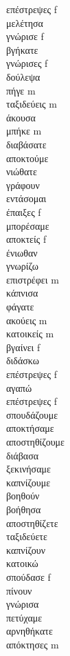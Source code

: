 επέστρεψες f \\ 
μελέτησα  \\ 
γνώρισε f \\ 
βγήκατε  \\ 
γνώρισες f \\ 
δούλεψα  \\ 
πήγε m \\ 
ταξιδεύεις m \\ 
άκουσα  \\ 
μπήκε m \\ 
διαβάσατε  \\ 
αποκτούμε  \\ 
νιώθατε  \\ 
γράφουν  \\ 
εντάσομαι  \\ 
έπαιξες f \\ 
μπορέσαμε  \\ 
αποκτείς f \\ 
ένιωθαν  \\ 
γνωρίζω  \\ 
επιστρέφει m \\ 
κάπνισα  \\ 
φάγατε  \\ 
ακούεις m \\ 
κατοικείς m \\ 
βγαίνει f \\ 
διδάσκω  \\ 
επέστρεψες f \\ 
αγαπώ  \\ 
επέστρεψες f \\ 
σπουδάζουμε  \\ 
αποκτήσαμε  \\ 
αποστηθίζουμε  \\ 
διάβασα  \\ 
ξεκινήσαμε  \\ 
καπνίζουμε  \\ 
βοηθούν  \\ 
βοήθησα  \\ 
αποστηθίζετε  \\ 
ταξιδεύετε  \\ 
καπνίζουν  \\ 
κατοικώ  \\ 
σπούδασε f \\ 
πίνουν  \\ 
γνώρισα  \\ 
πετύχαμε  \\ 
αρνηθήκατε  \\ 
απόκτησες m \\ 
